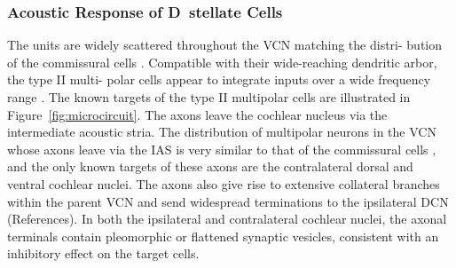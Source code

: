 

\subsubsection{Acoustic Response of D~stellate  Cells}



The \OnC units are widely scattered throughout the VCN %
matching the distri- bution of the commissural cells
\citep{PaoliniClareyEtAl:2005,NeedhamPaolini:2007}. %
Compatible with their wide-reaching dendritic arbor, the type II multi- polar
cells appear to integrate inputs over a wide frequency range
\citep{PalmerWallaceEtAl:2003}.  The known targets of the type II multipolar
cells are illustrated in Figure~\ref{fig:microcircuit}. The axons leave the
cochlear nucleus via the intermediate acoustic stria. %
The distribution of multipolar neurons in the VCN whose axons leave via the IAS
is very similar to that of the commissural cells %
, and the only known targets of these axons are the contralateral dorsal and
ventral cochlear nuclei.%
The axons also give rise to extensive collateral branches within the parent VCN
and send widespread terminations to the ipsilateral DCN
(References). %
In both the ipsilateral and contralateral cochlear nuclei, the axonal terminals
contain pleomorphic or flattened synaptic vesicles, consistent with an
inhibitory effect on the target cells. %

